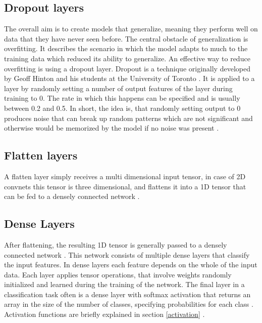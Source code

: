 \subsection{Dropout layers}
\label{dropout}
The overall aim is to create models that generalize, meaning they perform well on data that they have never seen before. The central obstacle of generalization is overfitting. It describes the scenario in which the model adapts to much to the training data which reduced its ability to generalize. An effective way to reduce overfitting is using a dropout layer. Dropout is a technique originally developed by Geoff Hinton and his students at the University of Toronto \cite{hinton}. It is applied to a layer by randomly setting a number of output features of the layer during training to 0. The rate in which this happens can be specified and is usually between 0.2 and 0.5. In short, the idea is, that randomly setting output to 0 produces noise that can break up random patterns which are not significant and otherwise would be memorized by the model if no noise was present \cite[Chapter~4]{cnn}. 

\subsection{Flatten layers}
\label{flatten}
A flatten layer simply receives a multi dimensional input tensor, in case of 2D convnets this tensor is three dimensional, and flattens it into a 1D tensor that can be fed to a densely connected network \cite[Chapter~5]{cnn}. 

\subsection{Dense Layers}
\label{dense}
After flattening, the resulting 1D tensor is generally passed to a densely connected network \cite[Chapter~5]{cnn}. This network consists of multiple dense layers that classify the input features. In dense layers each feature depends on the whole of the input data. Each layer applies tensor operations, that involve weights randomly initialized and learned during the training of the network. The final layer in a classification task often is a dense layer with softmax activation that returns an array in the size of the number of classes, specifying probabilities for each class \cite[Chapter~2]{cnn}. Activation functions are briefly explained in section \ref{activation} . 

\newpage


